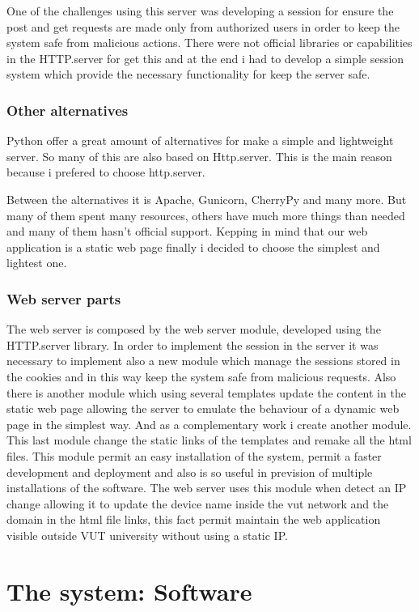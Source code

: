 		One of the challenges using this server was developing a session for ensure the post and get requests are made only from authorized users in order to keep the system safe from malicious actions. There were not official libraries or capabilities in the HTTP.server for get this and at the end i had to develop a simple session system which provide the necessary functionality for keep the server safe.

		\subsection{Other alternatives}
		Python offer a great amount of alternatives for make a simple and lightweight server. So many of this are also based on Http.server. This is the main reason because i prefered to choose http.server.

		Between the alternatives it is Apache, Gunicorn, CherryPy and many more. But many of them spent many resources, others have much more things than needed and many of them hasn't official support. Kepping in mind that our web application is a static web page finally i decided to choose the simplest and lightest one.

		\subsection{Web server parts}
		The web server is composed by the web server module, developed using the HTTP.server library. In order to implement the session in the server it was necessary to implement also a new module which manage the sessions stored in the cookies and in this way keep the system safe from malicious requests.
		Also there is another module which using several templates update the content in the static web page allowing the server to emulate the behaviour of a dynamic web page in the simplest way.
		And as a complementary work i create another module. This last module change the static links of the templates and remake all the html files. This module permit an easy installation of the system, permit a faster development and deployment and also is so useful in prevision of multiple installations of the software. The web server uses this module when detect an IP change allowing it to update the device name inside the vut network and the domain in the html file links, this fact permit maintain the web application visible outside VUT university without using a static IP.

\chapter{The system: Software}\label{chap:software}

